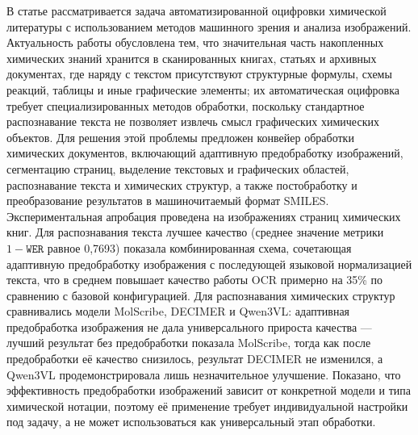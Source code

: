 В статье рассматривается задача автоматизированной оцифровки химической литературы с использованием методов машинного зрения и анализа изображений. Актуальность работы обусловлена тем, что значительная часть накопленных химических знаний хранится в сканированных книгах, статьях и архивных документах, где наряду с текстом присутствуют структурные формулы, схемы реакций, таблицы и иные графические элементы; их автоматическая оцифровка требует специализированных методов обработки, поскольку стандартное распознавание текста не позволяет извлечь смысл графических химических объектов.
Для решения этой проблемы предложен конвейер обработки химических документов, включающий адаптивную предобработку изображений, сегментацию страниц, выделение текстовых и графических областей, распознавание текста и химических структур, а также постобработку и преобразование результатов в машиночитаемый формат SMILES.
Экспериментальная апробация проведена на изображениях страниц химических книг. Для распознавания текста лучшее качество (среднее значение метрики $1-\mathtt{WER}$ равное 0,7693) показала комбинированная схема, сочетающая адаптивную предобработку изображения с последующей языковой нормализацией текста, что в среднем повышает качество работы OCR примерно на 35\% по сравнению с базовой конфигурацией. Для распознавания химических структур сравнивались модели MolScribe, DECIMER и Qwen3VL: адаптивная предобработка изображения не дала универсального прироста качества --- лучший результат без предобработки показала MolScribe, тогда как после предобработки её качество снизилось, результат DECIMER не изменился, а Qwen3VL продемонстрировала лишь незначительное улучшение.
Показано, что эффективность предобработки изображений зависит от конкретной модели и типа химической нотации, поэтому её применение требует индивидуальной настройки под задачу, а не может использоваться как универсальный этап обработки.
